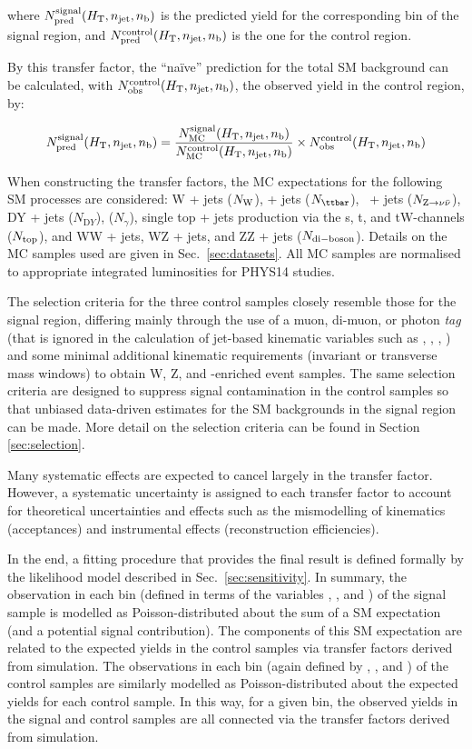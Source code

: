 where $N_{\textrm{pred}}^{\rm signal}(\mbox{$H_\text{T}$},n_{\text{jet}},n_{\text{b}})$ is the predicted yield for the corresponding bin of the signal region, and $N_{\textrm{pred}}^{\rm control}(\mbox{$H_\text{T}$},n_{\text{jet}},n_{\text{b}})$ is the one for the control region.

By this transfer factor, the ``na\"ive'' prediction for the total SM background can be calculated, with $N_{\textrm{obs}}^{\rm control}(\mbox{$H_\text{T}$},n_{\text{jet}},n_{\text{b}})$, the observed yield in the control region, by:

\begin{equation}
  \label{equ:pred-method}
  N_{\textrm{pred}}^{\rm signal}(\mbox{$H_\text{T}$},n_{\text{jet}},n_{\text{b}}) = \frac{N_{\rm MC}^{\rm
      signal}(\mbox{$H_\text{T}$},n_{\text{jet}},n_{\text{b}})}{N_{\rm MC}^{\rm
      control}(\mbox{$H_\text{T}$},n_{\text{jet}},n_{\text{b}})} \times N_{\textrm{obs}}^{\rm
    control}(\mbox{$H_\text{T}$},n_{\text{jet}},n_{\text{b}})   
\end{equation}

When constructing the transfer factors, the MC expectations for the following SM processes are considered: W + jets ($N_{\rm W}$), \ttbar + jets ($N_{\ttbar}$), \znunu\ + jets ($N_{{\text Z} \rightarrow \nu\bar{\nu}}$), DY + jets ($N_{\mathrm DY}$), \gj ($N_\gamma$), single top + jets production via the s, t, and tW-channels ($N_{\rm top}$), and WW + jets, WZ + jets, and ZZ + jets ($N_{\rm di-boson}$). Details on the MC samples used are given in Sec.~\ref{sec:datasets}. All MC samples are normalised to appropriate integrated luminosities for PHYS14 studies.

The selection criteria for the three control samples closely resemble those for the signal region, differing mainly through the use of a muon, di-muon, or photon {\it tag} (that is ignored in the calculation of jet-based kinematic variables such as \scalht, \mht, \alphat, \etc) and some minimal additional kinematic requirements (\eg invariant or transverse mass windows) to obtain W, Z, and \ttbar-enriched event samples. The same selection criteria are designed to suppress signal contamination in the control samples so that unbiased data-driven estimates for the SM backgrounds in the signal region can be made. More detail on the selection criteria can be found in Section \ref{sec:selection}.

Many systematic effects are expected to cancel largely in the transfer factor. However, a systematic uncertainty is assigned to each transfer factor to account for theoretical uncertainties and effects such as the mismodelling of kinematics (\eg acceptances) and instrumental effects (\eg reconstruction efficiencies).

In the end, a fitting procedure that provides the final result is defined formally by the likelihood model described in Sec.~\ref{sec:sensitivity}. In summary, the observation in each bin (defined in terms of the variables \njet, \nb, and \scalht) of the signal sample is modelled as Poisson-distributed about the sum of a SM expectation (and a potential signal contribution). The components of this SM expectation are related to the expected yields in the control samples via transfer factors derived from simulation. The observations in each bin (again defined by \njet, \nb, and \scalht) of the control samples are similarly modelled as Poisson-distributed about the expected yields for each control sample. In this way, for a given bin, the observed yields in the signal and control samples are all connected via the transfer factors derived from simulation.
